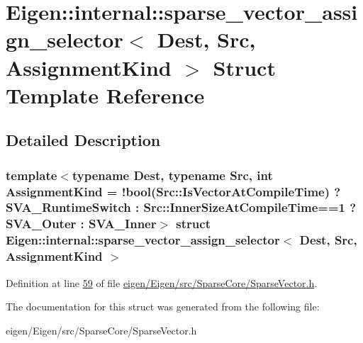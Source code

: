 \hypertarget{struct_eigen_1_1internal_1_1sparse__vector__assign__selector}{}\section{Eigen\+:\+:internal\+:\+:sparse\+\_\+vector\+\_\+assign\+\_\+selector$<$ Dest, Src, Assignment\+Kind $>$ Struct Template Reference}
\label{struct_eigen_1_1internal_1_1sparse__vector__assign__selector}


\subsection{Detailed Description}
\subsubsection*{template$<$typename Dest, typename Src, int Assignment\+Kind = !bool(\+Src\+::\+Is\+Vector\+At\+Compile\+Time) ? S\+V\+A\+\_\+\+Runtime\+Switch \+: Src\+::\+Inner\+Size\+At\+Compile\+Time==1 ? S\+V\+A\+\_\+\+Outer \+: S\+V\+A\+\_\+\+Inner$>$\newline
struct Eigen\+::internal\+::sparse\+\_\+vector\+\_\+assign\+\_\+selector$<$ Dest, Src, Assignment\+Kind $>$}



Definition at line \hyperlink{eigen_2_eigen_2src_2_sparse_core_2_sparse_vector_8h_source_l00059}{59} of file \hyperlink{eigen_2_eigen_2src_2_sparse_core_2_sparse_vector_8h_source}{eigen/\+Eigen/src/\+Sparse\+Core/\+Sparse\+Vector.\+h}.



The documentation for this struct was generated from the following file\+:\begin{DoxyCompactItemize}
\item 
eigen/\+Eigen/src/\+Sparse\+Core/\+Sparse\+Vector.\+h\end{DoxyCompactItemize}
